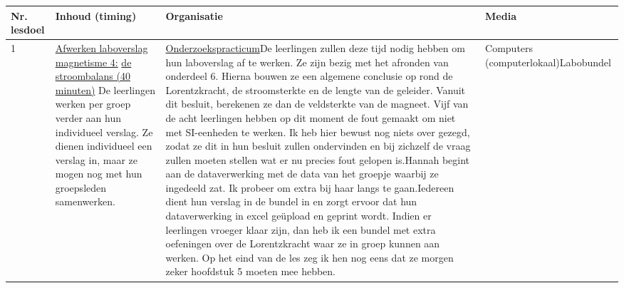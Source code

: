 \begin{landscape}
\begin{tabularx}{1.56\textwidth}{|p{1.5cm}|p{9cm}|X|p{4cm}|}
	\hline
	\textbf{Nr. lesdoel } & \textbf{Inhoud (timing)}  & \textbf{Organisatie } & \textbf{Media } \\ \hline
	1\newline\newline 2\newline\newline 3\newline\newline 4\newline\newline 5\newline\newline 6\newline\newline 7&\underline{Afwerken laboverslag magnetisme 4:} \underline{de stroombalans (40 minuten)}\newline
	De leerlingen werken per groep verder aan hun individueel verslag. Ze  dienen individueel een verslag in, maar ze mogen nog met hun groepsleden samenwerken.
	&  \underline{Onderzoekspracticum}\newline De leerlingen zullen deze tijd nodig hebben om hun laboverslag af te werken. Ze zijn bezig met het afronden van onderdeel 6. Hierna bouwen ze een algemene conclusie op rond de Lorentzkracht, de stroomsterkte en de lengte van de geleider. Vanuit dit besluit, berekenen ze dan de veldsterkte van de magneet. Vijf van de acht leerlingen hebben op dit moment de fout gemaakt om niet met SI-eenheden te werken. Ik heb hier bewust nog niets over gezegd, zodat ze dit in hun besluit zullen ondervinden en bij zichzelf de vraag zullen moeten stellen wat er nu precies fout gelopen is.\newline\newline Hannah begint aan de dataverwerking met de data van het groepje waarbij ze ingedeeld zat. Ik probeer om extra bij haar langs te gaan.\newline\newline Iedereen dient hun verslag in de bundel in en zorgt ervoor dat hun dataverwerking in excel geüpload en geprint wordt. Indien er leerlingen vroeger klaar zijn, dan heb ik een bundel met extra oefeningen over de Lorentzkracht waar ze in groep kunnen aan werken. \newline\newline Op het eind van de les zeg ik hen nog eens dat ze morgen zeker hoofdstuk 5 moeten mee hebben.
	&  Computers (computerlokaal)\newline\newline Labobundel
	\\ \hline
\end{tabularx}


	
\end{landscape}


